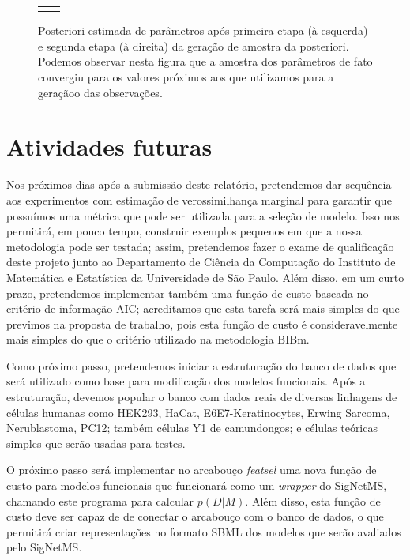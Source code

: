 \documentclass[12pt]{article}
\newcommand{\foreignword}[1]{\textit{#1}}
\begin{document}
\begin{figure}[!ht]
\begin{tabular}{c c}
{    \label{fig:posterior_kcat_2} }
    \\
  \end{tabular}
    \caption{Posteriori estimada de parâmetros após primeira etapa (à 
    esquerda) e segunda etapa (à direita) da geração de amostra da 
    posteriori. Podemos observar nesta figura que a amostra dos 
    parâmetros de fato convergiu para os valores próximos aos que 
    utilizamos para a geraçãoo das observações.}
  \label{fig:posteriori_parameters} 
\end{figure}




\section{Atividades futuras}
Nos próximos dias após a submissão deste relatório, pretendemos dar 
sequência aos experimentos com estimação de verossimilhança marginal 
para garantir que possuímos uma métrica que pode ser utilizada para a
seleção de modelo. Isso nos permitirá, em pouco tempo, construir 
exemplos pequenos em que a nossa metodologia pode ser testada; assim,
pretendemos fazer o exame de qualificação deste projeto junto ao 
Departamento de Ciência da Computação do Instituto de Matemática e 
Estatística da Universidade de São Paulo. Além disso, em um curto prazo,
pretendemos implementar também uma função de custo baseada no critério
de informação AIC; acreditamos que esta tarefa será mais simples do que
previmos na proposta de trabalho, pois esta função de custo é 
consideravelmente mais simples do que o critério utilizado na 
metodologia BIBm.

Como próximo passo, pretendemos iniciar a estruturação do banco de dados 
que será utilizado como base para modificação dos modelos funcionais. 
Após a estruturação, devemos popular o banco com dados reais de diversas 
linhagens de células humanas como HEK293, HaCat, E6E7-Keratinocytes,
Erwing Sarcoma, Nerublastoma, PC12; também células Y1 de camundongos; e
células teóricas simples que serão usadas para testes.

O próximo passo será implementar no arcabouço {\em featsel} uma nova
função de custo para modelos funcionais que funcionará como um 
\foreignword{wrapper} do SigNetMS, chamando este programa para calcular 
$p (D | M)$. Além disso, esta função de custo deve ser capaz de de
conectar o arcabouço com o banco de dados, o que permitirá criar 
representações no formato SBML dos modelos que serão avaliados pelo 
SigNetMS. 
\end{document}
